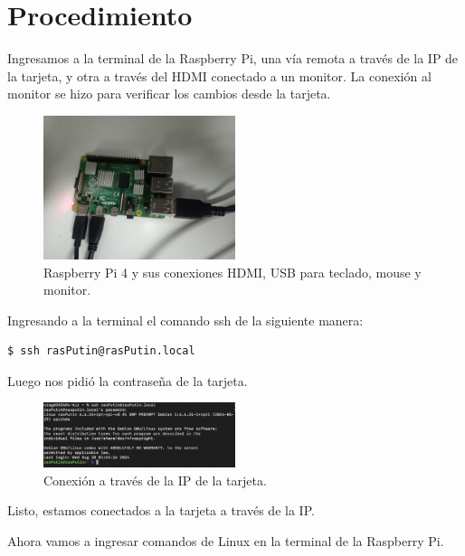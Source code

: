 \documentclass[12pt]{report}
\begin{document}
\section{Procedimiento}
Ingresamos a la terminal de la Raspberry Pi, una vía remota a través de la IP de la tarjeta, y otra a través del HDMI conectado a un monitor. La conexión al monitor se hizo para verificar los cambios desde la tarjeta.
\begin{figure}[H]
  \centering
  \includegraphics[width=0.5\textwidth]{Screenshots/raspberryPi.JPG}
  \caption{Raspberry Pi 4 y sus conexiones HDMI, USB para teclado, mouse y monitor.}
  \label{fig:raspberryPi}
\end{figure}
Ingresando a la terminal el comando ssh de la siguiente manera:
\begin{verbatim}
$ ssh rasPutin@rasPutin.local
\end{verbatim}
Luego nos pidió la contraseña de la tarjeta.
\begin{figure}[H]
  \centering
  \includegraphics[width=0.5\textwidth]{Screenshots/ssh.png}
  \caption{Conexión a través de la IP de la tarjeta.}
  \label{fig:ssh}
\end{figure}

Listo, estamos conectados a la tarjeta a través de la IP.

Ahora vamos a ingresar comandos de Linux en la terminal de la Raspberry Pi.
\end{document}

